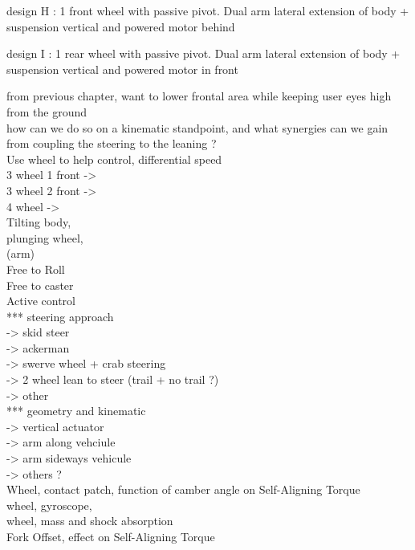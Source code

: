 design H : 1 front wheel with passive pivot. Dual arm lateral extension of body + suspension vertical and powered motor behind

design I : 1 rear wheel with passive pivot. Dual arm lateral extension of body + suspension vertical and powered motor in front


from previous chapter, want to lower frontal area while keeping user eyes high from the ground\\

how can we do so on a kinematic standpoint, and what synergies can we gain from coupling the steering to the leaning ?\\

Use wheel to help control, differential speed\\

3 wheel 1 front -> \\
3 wheel 2 front -> \\
4 wheel         -> \\

Tilting body, \\
plunging wheel, \\
(arm)\\

Free to Roll\\
Free to caster\\
Active control\\

*** steering approach\\
-> skid steer\\
-> ackerman\\
-> swerve wheel + crab steering\\
-> 2 wheel lean to steer (trail + no trail ?)\\
-> other\\
*** geometry and kinematic\\
-> vertical actuator\\
-> arm along vehciule\\
-> arm sideways vehicule\\
-> others ?\\


Wheel, contact patch, function of camber angle on Self-Aligning Torque\\
wheel, gyroscope, \\
wheel, mass and shock absorption \\
Fork Offset, effect on Self-Aligning Torque\\



